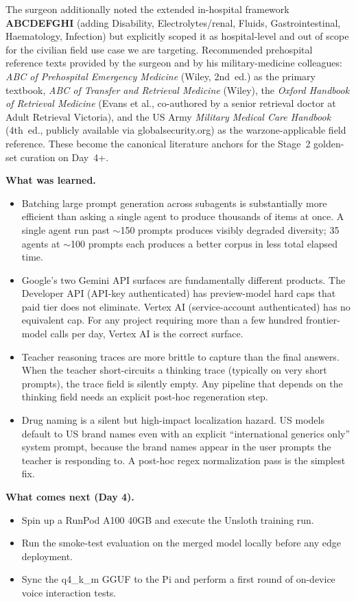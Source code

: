 \documentclass{article}
\theoremstyle{plain}
\theoremstyle{definition}
\theoremstyle{remark}
\begin{document}
The surgeon additionally noted the extended in-hospital framework \textbf{ABCDEFGHI} (adding Disability, Electrolytes/renal, Fluids, Gastrointestinal, Haematology, Infection) but explicitly scoped it as hospital-level and out of scope for the civilian field use case we are targeting. Recommended prehospital reference texts provided by the surgeon and by his military-medicine colleagues: \emph{ABC of Prehospital Emergency Medicine} (Wiley, 2nd~ed.) as the primary textbook, \emph{ABC of Transfer and Retrieval Medicine} (Wiley), the \emph{Oxford Handbook of Retrieval Medicine} (Evans et al., co-authored by a senior retrieval doctor at Adult Retrieval Victoria), and the US Army \emph{Military Medical Care Handbook} (4th~ed., publicly available via globalsecurity.org) as the warzone-applicable field reference. These become the canonical literature anchors for the Stage~2 golden-set curation on Day~4+.

\textbf{What was learned.}
\begin{itemize}
\item Batching large prompt generation across subagents is substantially more efficient than asking a single agent to produce thousands of items at once. A single agent run past $\sim$150 prompts produces visibly degraded diversity; 35 agents at $\sim$100 prompts each produces a better corpus in less total elapsed time.
\item Google's two Gemini API surfaces are fundamentally different products. The Developer API (API-key authenticated) has preview-model hard caps that paid tier does not eliminate. Vertex AI (service-account authenticated) has no equivalent cap. For any project requiring more than a few hundred frontier-model calls per day, Vertex AI is the correct surface.
\item Teacher reasoning traces are more brittle to capture than the final answers. When the teacher short-circuits a thinking trace (typically on very short prompts), the trace field is silently empty. Any pipeline that depends on the thinking field needs an explicit post-hoc regeneration step.
\item Drug naming is a silent but high-impact localization hazard. US models default to US brand names even with an explicit ``international generics only'' system prompt, because the brand names appear in the user prompts the teacher is responding to. A post-hoc regex normalization pass is the simplest fix.
\end{itemize}

\textbf{What comes next (Day 4).}
\begin{itemize}
\item Spin up a RunPod A100 40GB and execute the Unsloth training run.
\item Run the smoke-test evaluation on the merged model locally before any edge deployment.
\item Sync the q4\_k\_m GGUF to the Pi and perform a first round of on-device voice interaction tests.
\end{itemize}
\end{document}
